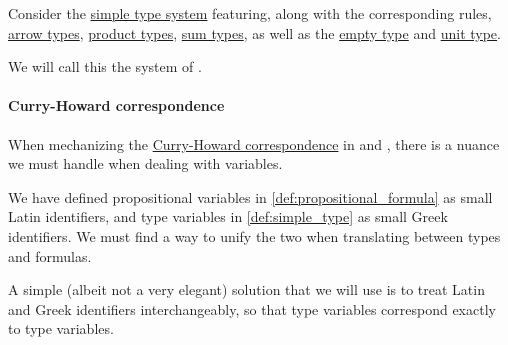 \begin{definition}\label{def:simple_algebraic_types}\mimprovised
  Consider the \hyperref[def:simple_type_system]{simple type system} featuring, along with the corresponding rules, \hyperref[def:arrow_type]{arrow types}, \hyperref[def:simple_product_type]{product types}, \hyperref[def:simple_product_type]{sum types}, as well as the \hyperref[def:simple_empty_type]{empty type} and \hyperref[def:simple_unit_type]{unit type}.

  We will call this the system of .
\end{definition}

\paragraph{Curry-Howard correspondence}

\begin{remark}\label{rem:curry_howard_variables}
  When mechanizing the \hyperref[con:curry_howard_correspondence]{Curry-Howard correspondence} in  and , there is a nuance we must handle when dealing with variables.

  We have defined propositional variables in \cref{def:propositional_formula} as small Latin identifiers, and type variables in \cref{def:simple_type} as small Greek identifiers. We must find a way to unify the two when translating between types and formulas.

  A simple (albeit not a very elegant) solution that we will use is to treat Latin and Greek identifiers interchangeably, so that type variables correspond exactly to type variables.
\end{remark}

